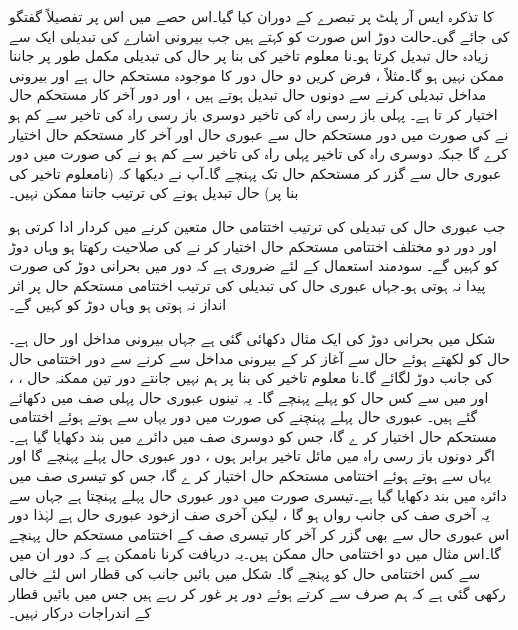  کا تذکرہ ایس آر پلٹ پر تبصرے کے دوران کیا گیا۔اس حصے میں اس پر تفصیلاً گفتگو کی جائے گی۔حالت دوڑ اس صورت کو کہتے ہیں جب بیرونی اشارے کی تبدیلی ایک سے زیادہ حال تبدیل کرتا ہو۔نا معلوم تاخیر کی بنا پر حال کی تبدیلی مکمل طور پر جاننا ممکن نہیں ہو گا۔مثلاً ، فرض کریں دو حال دور کا موجودہ مستحکم حال  ہے اور بیرونی مداخل تبدیلی کرنے سے دونوں حال تبدیل ہوتے ہیں ، اور دور آخر کار  مستحکم حال اختیار کر تا ہے۔ پہلی باز رسی راہ کی تاخیر دوسری باز رسی راہ کی تاخیر سے کم ہو نے کی صورت میں دور مستحکم حال  سے عبوری حال  اور آخر کار مستحکم حال  اختیار کرے گا جبکہ دوسری راہ کی تاخیر پہلی راہ کی تاخیر سے کم ہو نے کی صورت میں دور عبوری حال  سے گزر کر مستحکم حال  تک پہنچے گا۔آپ نے دیکھا کہ (نامعلوم تاخیر کی بنا پر) حال تبدیل ہونے کی ترتیب جاننا ممکن نہیں۔

جب عبوری حال کی تبدیلی کی ترتیب اختتامی حال متعین کرنے میں کردار ادا کرتی ہو اور دور دو مختلف اختتامی مستحکم حال اختیار کر نے کی صلاحیت رکھتا ہو وہاں دوڑ کو  کہیں گے۔ سودمند استعمال کے لئے ضروری ہے کہ دور میں بحرانی دوڑ کی صورت پیدا نہ ہوتی ہو۔جہاں عبوری حال کی تبدیلی کی ترتیب اختتامی مستحکم حال پر اثر انداز نہ ہوتی ہو وہاں دوڑ کو کہیں گے۔



شکل میں بحرانی دوڑ کی ایک مثال دکھائی گئی ہے جہاں بیرونی مداخل  اور حال  ہے۔ حال کو   لکھتے ہوئے حال  سے آغاز کر کے بیرونی مداخل  سے  کرنے سے دور اختتامی حال کی جانب دوڑ لگائے گا۔نا معلوم تاخیر کی بنا پر ہم نہیں جانتے دور تین ممکنہ حال ، ، اور  میں سے کس حال کو پہلے پہنچے گا۔ یہ تینوں عبوری حال پہلی صف میں دکھائے گئے ہیں۔ عبوری حال  پہلے پہنچنے کی صورت میں دور یہاں سے ہوتے ہوئے اختتامی مستحکم حال  اختیار کر ے گا، جس کو دوسری صف میں دائرے میں بند دکھایا گیا ہے۔اگر دونوں باز رسی راہ میں مائل تاخیر برابر ہوں ، دور عبوری حال  پہلے پہنچے گا اور یہاں سے ہوتے ہوئے اختتامی مستحکم حال  اختیار کر ے گا، جس کو تیسری صف میں دائرہ میں بند دکھایا گیا ہے۔تیسری صورت میں دور عبوری حال  پہلے پہنچتا ہے جہاں سے یہ آخری صف کی جانب رواں ہو گا ، لیکن آخری صف ازخود عبوری حال ہے لہٰذا دور اس عبوری حال سے بھی گزر کر آخر کار تیسری صف کے اختتامی مستحکم حال  پہنچے گا۔اس مثال میں دو اختتامی حال ممکن ہیں۔یہ دریافت کرنا ناممکن ہے کہ دور ان میں سے کس اختتامی حال کو پہنچے گا۔ شکل میں بائیں جانب  کی قطار اس لئے خالی رکھی گئی ہے کہ ہم صرف  سے  کرتے ہوئے دور پر غور کر رہے ہیں جس میں بائیں قطار کے اندراجات درکار نہیں۔

